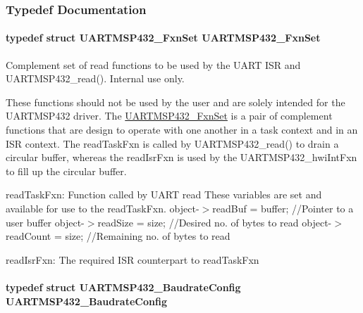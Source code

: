 \subsubsection{Typedef Documentation}
\paragraph[{U\+A\+R\+T\+M\+S\+P432\+\_\+\+Fxn\+Set}]{\setlength{\rightskip}{0pt plus 5cm}typedef struct {\bf U\+A\+R\+T\+M\+S\+P432\+\_\+\+Fxn\+Set}  {\bf U\+A\+R\+T\+M\+S\+P432\+\_\+\+Fxn\+Set}}\label{_u_a_r_t_m_s_p432_8h_abe16bba058f09acef62973f6bb9498d5}


Complement set of read functions to be used by the U\+A\+R\+T I\+S\+R and U\+A\+R\+T\+M\+S\+P432\+\_\+read(). Internal use only. 

These functions should not be used by the user and are solely intended for the U\+A\+R\+T\+M\+S\+P432 driver. The \hyperlink{struct_u_a_r_t_m_s_p432___fxn_set}{U\+A\+R\+T\+M\+S\+P432\+\_\+\+Fxn\+Set} is a pair of complement functions that are design to operate with one another in a task context and in an I\+S\+R context. The read\+Task\+Fxn is called by U\+A\+R\+T\+M\+S\+P432\+\_\+read() to drain a circular buffer, whereas the read\+Isr\+Fxn is used by the U\+A\+R\+T\+M\+S\+P432\+\_\+hwi\+Int\+Fxn to fill up the circular buffer.

read\+Task\+Fxn\+: Function called by U\+A\+R\+T read These variables are set and available for use to the read\+Task\+Fxn. object-\/$>$read\+Buf = buffer; //\+Pointer to a user buffer object-\/$>$read\+Size = size; //\+Desired no. of bytes to read object-\/$>$read\+Count = size; //\+Remaining no. of bytes to read

read\+Isr\+Fxn\+: The required I\+S\+R counterpart to read\+Task\+Fxn 
\paragraph[{U\+A\+R\+T\+M\+S\+P432\+\_\+\+Baudrate\+Config}]{\setlength{\rightskip}{0pt plus 5cm}typedef struct {\bf U\+A\+R\+T\+M\+S\+P432\+\_\+\+Baudrate\+Config}  {\bf U\+A\+R\+T\+M\+S\+P432\+\_\+\+Baudrate\+Config}}\label{_u_a_r_t_m_s_p432_8h_a928164bf503e9f2e23b9ed0c0f4a0ae7}


